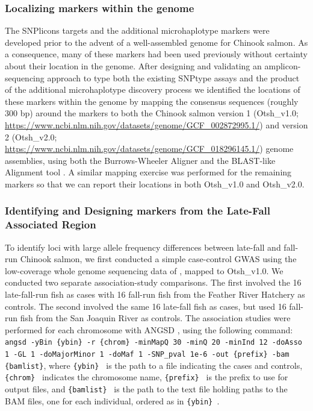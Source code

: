 \subsubsection*{Localizing markers within the genome}

The SNPlicons targets and the additional microhaplotype markers were
developed prior to the advent of a well-assembled genome for Chinook salmon.
As a consequence, many of these markers had
been used previously without certainty about their location in the genome.
After designing and validating an amplicon-sequencing approach to type both the
existing SNPtype assays and the product of the additional microhaplotype
discovery process we identified the locations of these markers within the genome by mapping the
consensus sequences (roughly 300 bp) around the markers
to both the Chinook salmon version 1 (Otsh\_v1.0; \url{https://www.ncbi.nlm.nih.gov/datasets/genome/GCF_002872995.1/}) and version 2  (Otsh\_v2.0; \url{https://www.ncbi.nlm.nih.gov/datasets/genome/GCF_018296145.1/}) genome assemblies,
using both the Burrows-Wheeler Aligner \citep{bwa-mem2009} and the BLAST-like Alignment tool \citep{kent2002blat}.
A similar mapping exercise was performed for the remaining markers so that we can
report their locations in both Otsh\_v1.0 and Otsh\_v2.0.


\subsubsection*{Identifying and Designing markers from the Late-Fall Associated Region}

To identify loci with large allele frequency differences between late-fall and fall-run Chinook salmon, 
we first conducted a simple case-control GWAS using the low-coverage whole genome sequencing 
data of \citet{thompson2020complex}, mapped to Otsh\_v1.0.  We conducted
two separate association-study comparisons.  
The first involved the 16 late-fall-run fish as cases with 16 fall-run fish from the Feather River Hatchery as controls. 
The second involved the same 16 late-fall fish as cases, but used 16 fall-run fish from the San 
Joaquin River as controls.  The association studies were performed for each chromosome with 
ANGSD \citep{pmid21663684,korneliussen_angsd_2014}, using the following command: {\footnotesize\tt angsd -yBin \{ybin\}  -r \{chrom\} 
-minMapQ 30 -minQ 20 -minInd 12 -doAsso 1 -GL 1 -doMajorMinor 1 -doMaf 1 -SNP\_pval 1e-6  
-out \{prefix\}  -bam \{bamlist\}}, where {\tt \{ybin\} } is the path to a file indicating the cases and 
controls, 
{\tt \{chrom\} } indicates the chromosome name, {\tt \{prefix\} } is the prefix to use for output files, and 
{\tt \{bamlist\} } is the path to the text file holding paths to the BAM files, one for each individual, ordered as in {\tt \{ybin\} }.

